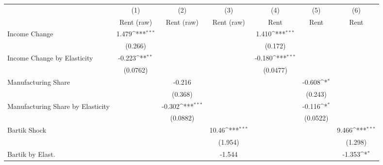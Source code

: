 {
\def\sym#1{\ifmmode^{#1}\else\(^{#1}\)\fi}
\begin{tabular}{l*{6}{c}}
\hline\hline
                    &\multicolumn{1}{c}{(1)}&\multicolumn{1}{c}{(2)}&\multicolumn{1}{c}{(3)}&\multicolumn{1}{c}{(4)}&\multicolumn{1}{c}{(5)}&\multicolumn{1}{c}{(6)}\\
                    &\multicolumn{1}{c}{Rent (raw)}&\multicolumn{1}{c}{Rent (raw)}&\multicolumn{1}{c}{Rent (raw)}&\multicolumn{1}{c}{Rent}&\multicolumn{1}{c}{Rent}&\multicolumn{1}{c}{Rent}\\
\hline
Income Change       &       1.479\sym{***}&                     &                     &       1.410\sym{***}&                     &                     \\
                    &     (0.266)         &                     &                     &     (0.172)         &                     &                     \\
[1em]
Income Change by Elasticity&      -0.223\sym{**} &                     &                     &      -0.180\sym{***}&                     &                     \\
                    &    (0.0762)         &                     &                     &    (0.0477)         &                     &                     \\
[1em]
Manufacturing Share &                     &      -0.216         &                     &                     &      -0.608\sym{*}  &                     \\
                    &                     &     (0.368)         &                     &                     &     (0.243)         &                     \\
[1em]
Manufacturing Share by Elasticity&                     &      -0.302\sym{***}&                     &                     &      -0.116\sym{*}  &                     \\
                    &                     &    (0.0882)         &                     &                     &    (0.0522)         &                     \\
[1em]
Bartik Shock        &                     &                     &       10.46\sym{***}&                     &                     &       9.466\sym{***}\\
                    &                     &                     &     (1.954)         &                     &                     &     (1.298)         \\
[1em]
Bartik by Elast.    &                     &                     &      -1.544         &                     &                     &      -1.353\sym{*}  \\

\end{tabular}}
